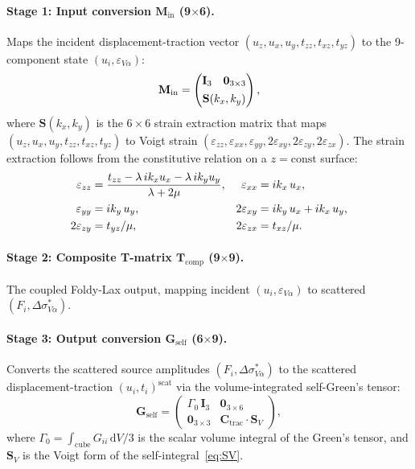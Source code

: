 \documentclass[11pt,a4paper]{article}
\newcommand{\bG}{\mathbf{G}}
\newcommand{\bI}{\mathbf{I}}
\newcommand{\dd}{\mathrm{d}}
\newcommand{\bT}{\mathbf{T}}
\newcommand{\bS}{\mathbf{S}}
\newcommand{\bC}{\mathbf{C}}
\newcommand{\bM}{\mathbf{M}}
\begin{document}
\paragraph{Stage 1: Input conversion $\bM_\text{in}$ (9$\times$6).}
Maps the incident displacement-traction vector
$(u_z, u_x, u_y, t_{zz}, t_{xz}, t_{yz})$ to the 9-component state
$(u_i, \varepsilon_{V\alpha})$:
\begin{equation}
  \bM_\text{in}
  = \begin{pmatrix}
      \bI_3 & \mathbf{0}_{3 \times 3} \\[4pt]
      \multicolumn{2}{c}{\bS(k_x, k_y)}
    \end{pmatrix},
  \label{eq:Min}
\end{equation}
where $\bS(k_x, k_y)$ is the $6 \times 6$ strain extraction matrix
that maps $(u_z, u_x, u_y, t_{zz}, t_{xz}, t_{yz})$ to Voigt strain
$(\varepsilon_{zz}, \varepsilon_{xx}, \varepsilon_{yy},
  2\varepsilon_{xy}, 2\varepsilon_{zy}, 2\varepsilon_{zx})$.  The
strain extraction follows from the constitutive relation on a
$z = \text{const}$ surface:
\begin{align}
  \varepsilon_{zz}  &= \frac{t_{zz} - \lambda\,ik_x u_x
    - \lambda\,ik_y u_y}{\lambda + 2\mu},
  &\varepsilon_{xx}  &= ik_x\,u_x, \notag \\
  \varepsilon_{yy}  &= ik_y\,u_y,
  &2\varepsilon_{xy} &= ik_y\,u_x + ik_x\,u_y, \notag \\
  2\varepsilon_{zy} &= t_{yz} / \mu,
  &2\varepsilon_{zx} &= t_{xz} / \mu.
  \label{eq:strain_extract}
\end{align}

\paragraph{Stage 2: Composite T-matrix $\bT_\text{comp}$
  (9$\times$9).}
The coupled Foldy-Lax output, mapping incident
$(u_i, \varepsilon_{V\alpha})$ to scattered
$(F_i, \Delta\sigma^*_{V\alpha})$.

\paragraph{Stage 3: Output conversion $\bG_\text{self}$
  (6$\times$9).}
Converts the scattered source amplitudes
$(F_i, \Delta\sigma^*_{V\alpha})$ to the scattered
displacement-traction $(u_i, t_i)^\text{scat}$ via the
volume-integrated self-Green's tensor:
\begin{equation}
  \bG_\text{self}
  = \begin{pmatrix}
      \Gamma_0\,\bI_3 & \mathbf{0}_{3 \times 6} \\[4pt]
      \mathbf{0}_{3 \times 3} & \bC_\text{trac} \cdot \bS_V
    \end{pmatrix},
  \label{eq:Gself}
\end{equation}
where $\Gamma_0 = \int_\text{cube} G_{ii}\,\dd V / 3$ is the scalar
volume integral of the Green's tensor, and $\bS_V$ is the Voigt form
of the self-integral~\eqref{eq:SV}.
\end{document}
